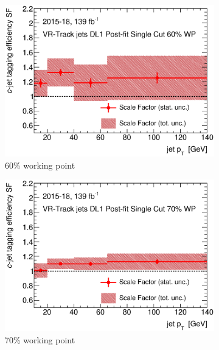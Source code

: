 \begin{figure}[H]
	\centering
	\begin{subfigure}[t]{.35\linewidth}
		\includegraphics[width=1\textwidth]{FTAG_plots/DL1allVRJetsDec/SF60.eps}
		\caption{60\% working point}
			\end{subfigure}
		\begin{subfigure}[t]{.35\linewidth}
			\includegraphics[width=1\textwidth]{FTAG_plots/DL1allVRJetsDec/SF70.eps}
			\caption{70\% working point}
		\end{subfigure}
		\begin{subfigure}[t]{.35\linewidth}

\end{subfigure}
\end{figure}
